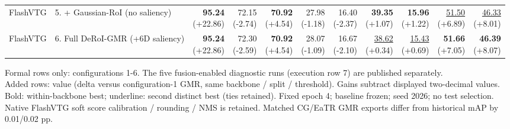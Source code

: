 \documentclass{article}
\begin{document}
{\begin{tabular}{llrrrrrrrrr}
FlashVTG & 5. + Gaussian-RoI (no saliency) & \shortstack{\textbf{95.24} \\ {\scriptsize (+22.86)}} & \shortstack{72.15 \\ {\scriptsize (-2.74)}} & \shortstack{\textbf{70.92} \\ {\scriptsize (+4.54)}} & \shortstack{27.98 \\ {\scriptsize (-1.18)}} & \shortstack{16.40 \\ {\scriptsize (-2.37)}} & \shortstack{\textbf{39.35} \\ {\scriptsize (+1.07)}} & \shortstack{\textbf{15.96} \\ {\scriptsize (+1.22)}} & \shortstack{\underline{51.50} \\ {\scriptsize (+6.89)}} & \shortstack{\underline{46.33} \\ {\scriptsize (+8.01)}} \\
FlashVTG & 6. Full DeRoI-GMR (+6D saliency) & \shortstack{\textbf{95.24} \\ {\scriptsize (+22.86)}} & \shortstack{72.30 \\ {\scriptsize (-2.59)}} & \shortstack{\textbf{70.92} \\ {\scriptsize (+4.54)}} & \shortstack{28.07 \\ {\scriptsize (-1.09)}} & \shortstack{16.67 \\ {\scriptsize (-2.10)}} & \shortstack{\underline{38.62} \\ {\scriptsize (+0.34)}} & \shortstack{\underline{15.43} \\ {\scriptsize (+0.69)}} & \shortstack{\textbf{51.66} \\ {\scriptsize (+7.05)}} & \shortstack{\textbf{46.39} \\ {\scriptsize (+8.07)}} \\
\bottomrule\end{tabular}}\par\medskip\footnotesize
Formal rows only: configurations 1-6. The five fusion-enabled diagnostic runs (execution row 7) are published separately.\\Added rows: value (delta versus configuration-1 GMR, same backbone / split / threshold). Gains subtract displayed two-decimal values.\\Bold: within-backbone best; underline: second distinct best (ties retained). Fixed epoch 4; baseline frozen; seed 2026; no test selection.\\Native FlashVTG soft score calibration / rounding / NMS is retained. Matched CG/EaTR GMR exports differ from historical mAP by 0.01/0.02 pp.
\end{document}
